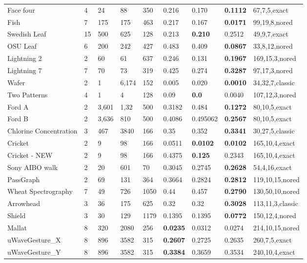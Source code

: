 \begin{table}[t!]
{{\begin{tabularx}{\linewidth}{@{} l *7X @{} l}
Face four & 4 & 24 & 88 & 350 & 0.216 & 0.170 & \textbf{0.1112} & 67,7,5,exact \\
Fish & 7 & 175 & 175 & 463 & 0.217 & 0.167 & \textbf{0.0171} & 99,19,8,nored \\
Swedish Leaf & 15 & 500 & 625 & 128 & 0.213 & \textbf{0.210} & 0.2512 & 49,9,7,exact \\
OSU Leaf & 6 & 200 & 242 & 427 & 0.483 & 0.409 & \textbf{0.0867} & 33,8,12,nored \\
Lightning 2 & 2 & 60 & 61 & 637 & 0.246 & 0.131 & \textbf{0.1967} & 169,15,3,nored \\
Lightning 7 & 7 & 70 & 73 & 319 & 0.425 & 0.274 & \textbf{0.3287} & 97,17,3,nored \\
Wafer & 2 & 1 & 6,174 & 152 & 0.005 & 0.020 & \textbf{0.0010} & 34,32,7,classic \\
Two Patterns & 4 & 1 & 4 & 128 & 0.09 & \textbf{0.0} & 0.0040 & 107,12,3,nored \\
Ford A & 2 & 3,601 & 1,32 & 500 & 0.3182 & 0.484 & \textbf{0.1272} & 80,10,5,exact \\
Ford B & 2 & 3,636 & 810 & 500 & 0.4086 & 0.495062 & \textbf{0.2567} & 80,10,5,exact \\
Chlorine Concentration & 3 & 467 & 3840 & 166 & 0.35 & 0.352 & \textbf{0.3341} & 30,27,5,classic \\
Cricket & 2 & 9 & 98 & 166 & 0.0511 & \textbf{0.0102} & \textbf{0.0102} & 165,10,4,exact \\
Cricket - NEW & 2 & 9 & 98 & 166 & 0.4375 & \textbf{0.125} & 0.2343 & 165,10,4,exact \\
Sony AIBO walk & 2 & 20 & 601 & 70 & 0.3045 & 0.2745 & \textbf{0.2628} & 54,4,16,exact \\
PassGraph & 2 & 69 & 131 & 364 & 0.3664 & 0.2824 & \textbf{0.2812} & 119,10,15,nored \\
Wheat Spectrography & 7 & 49 & 726 & 1050 & 0.44 & 0.457 & \textbf{0.2790} & 130,50,10,nored \\
Arrowhead & 3 & 36 & 175 & 625 & 0.32 & 0.32 & \textbf{0.3028} & 113,11,3,classic \\
Shield & 3 & 30 & 129 & 1179 & 0.1395 & 0.1395 & \textbf{0.0772} & 150,12,4,nored \\
Mallat & 8 & 320 & 2080 & 256 & \textbf{0.0235} & 0.0312 & 0.0274 & 214,10,15,nored \\ 
uWaveGesture\_X & 8 & 896 & 3582 & 315 & \textbf{0.2607} & 0.2725 & 0.2635 & 260,7,5,exact \\
uWaveGesture\_Y & 8 & 896 & 3582 & 315 & \textbf{0.3384} & 0.3659 & 0.3534 & 240,10,4,exact \\

\end{tabularx}}}
\end{table}
